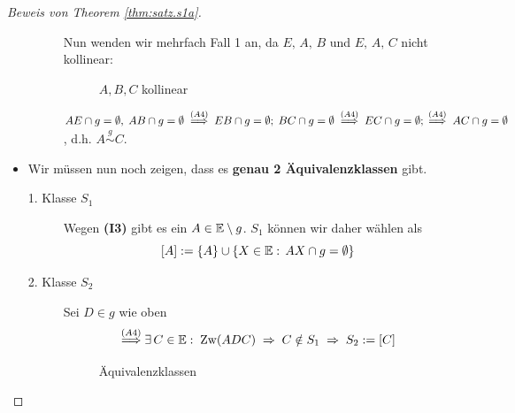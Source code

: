 \begin{proof}[Beweis von Theorem \ref{thm:satz.s1a}]
\begin{itemize}
\begin{description}

                Nun wenden wir mehrfach Fall 1 an, da  $E,\,A,\,B$ und  $E,\,A,\,C$ nicht kollinear:

                \begin{figure}[h]
                    
                    \caption{$A, B, C$ kollinear}
                \end{figure}

                ${AE} \cap g = \emptyset,\; {AB} \cap g=\emptyset\;
                \stackrel{(A4)}{\Longrightarrow}\; {EB} \cap g = \emptyset;\; {BC}\cap g =
                \emptyset\; \stackrel{(A4)}{\Longrightarrow}\; {EC} \cap g = \emptyset;\;
                \stackrel{(A4)}{\Longrightarrow}\; {AC} \cap g = \emptyset$, d.h.
                $A\stackrel{g}{\sim} C$.
        \end{description}

        \item Wir müssen nun noch zeigen, dass es {\bf genau 2 Äquivalenzklassen} gibt.
        \begin{description}
            \item[1. Klasse $S_1$] Wegen \textbf{(I3)} gibt es ein $A \in \mathbb E \setminus g$. $S_1$
                können wir daher wählen als
                $$
                    [A] := \{ A \} \cup \{ X \in \mathbb E:\, {AX} \cap g = \emptyset \}
                $$
            \item[2. Klasse $S_2$] Sei $D\in g$ wie oben
                $$
                    \stackrel{(A4)}{\Longrightarrow} \exists\, C \in \mathbb E:\; \operatorname{Zw}(ADC)\; \Rightarrow\;
                    C \notin S_1\; \Rightarrow\; S_2 := [C]
                $$

                \begin{figure}[h]
                    
                    \caption{Äquivalenzklassen}
                \end{figure}
        \end{description}


\end{itemize}
\end{proof}
